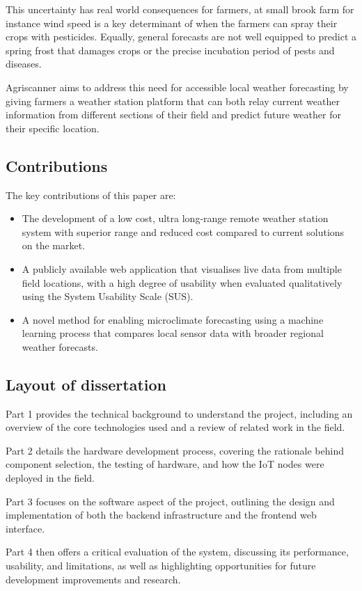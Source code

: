 This uncertainty has real world consequences for farmers, at small brook farm
for instance wind speed is a key determinant of when the farmers can spray their
crops with pesticides. Equally, general forecasts are not well equipped to
predict a spring frost that damages crops or the precise incubation period of
pests and diseases.

Agriscanner aims to address this need for accessible local weather forecasting
by giving farmers a weather station platform that can both relay current weather
information from different sections of their field and predict future weather
for their specific location. 

\subsection{Contributions}

The key contributions of this paper are:

\begin{itemize}
    \item The development of a low cost, ultra long-range remote weather station
    system with superior range and reduced cost compared to current solutions on
    the market.
    \item A publicly available web application that visualises live data from
    multiple field locations, with a high degree of usability when evaluated
    qualitatively using the System Usability Scale (SUS).
    \item A novel method for enabling microclimate forecasting using a machine
    learning process that compares local sensor data with broader regional
    weather forecasts.
\end{itemize}

\subsection{Layout of dissertation}

Part 1 provides the technical background to understand the project, including an
overview of the core technologies used and a review of related work in the
field.

Part 2 details the hardware development process, covering the rationale behind
component selection, the testing of hardware, and how the IoT nodes were
deployed in the field.

Part 3 focuses on the software aspect of the project, outlining the design and
implementation of both the backend infrastructure and the frontend web
interface.

Part 4 then offers a critical evaluation of the system, discussing its
performance, usability, and limitations, as well as highlighting opportunities
for future development improvements and research. 


  

